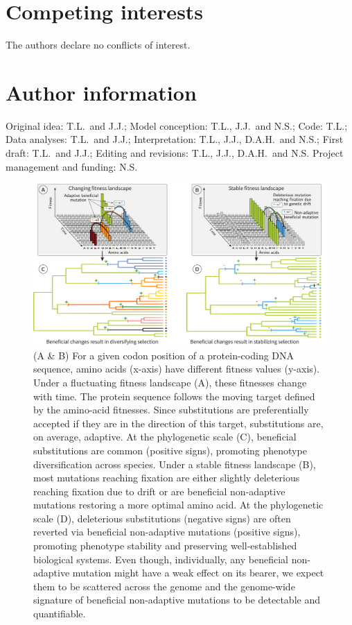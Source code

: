 \documentclass{article}
\begin{document}
    \section*{Competing interests}
    The authors declare no conflicts of interest.

    \section*{Author information}
    Original idea: T.L.\ and J.J.;
    Model conception: T.L., J.J.\ and N.S.;
    Code: T.L.;
    Data analyses: T.L.\ and J.J.;
    Interpretation: T.L., J.J., D.A.H.\ and N.S.;
    First draft: T.L.\ and J.J.;
    Editing and revisions: T.L., J.J., D.A.H.\ and N.S.
    Project management and funding: N.S\@.

    \printbibliography
    \newpage
    \begin{figure}[!htb]
        \centering
        \includegraphics[width=\textwidth, page=1] {artworks/figure.fitness-landscape}
        \caption{
            (A \& B) For a given codon position of a protein-coding DNA sequence, amino acids (x-axis) have different fitness values (y-axis).
            Under a fluctuating fitness landscape (A), these fitnesses change with time.
            The protein sequence follows the moving target defined by the amino-acid fitnesses. Since substitutions are preferentially accepted if they are in the direction of this target, substitutions are, on average, adaptive.
            At the phylogenetic scale (C), beneficial substitutions are common (positive signs), promoting phenotype diversification across species.
            Under a stable fitness landscape (B), most mutations reaching fixation are either slightly deleterious reaching fixation due to drift or are beneficial non-adaptive mutations restoring a more optimal amino acid.
            At the phylogenetic scale (D), deleterious substitutions (negative signs) are often reverted via beneficial non-adaptive mutations (positive signs), promoting phenotype stability and preserving well-established biological systems.
            Even though, individually, any beneficial non-adaptive mutation might have a weak effect on its bearer, we expect them to be scattered across the genome and the genome-wide signature of beneficial non-adaptive mutations to be detectable and quantifiable.}
        \label{fig:fitness-landscape}
    \end{figure}
\end{document}
